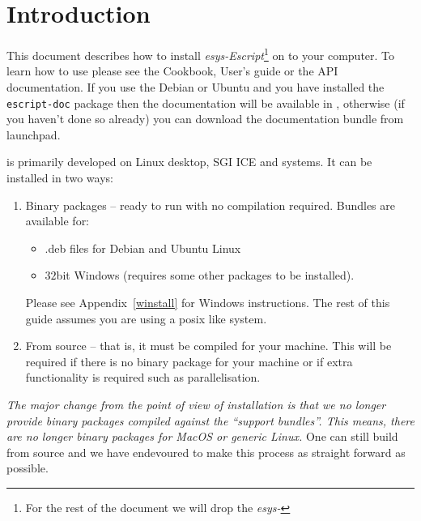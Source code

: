 %
%
%

\chapter{Introduction}
This document describes how to install \emph{esys-Escript}\footnote{For the rest of the document we will drop the \emph{esys-}} on to your computer.
To learn how to use \esfinley please see the Cookbook, User's guide or the API documentation.
If you use the Debian or Ubuntu and you have installed the \texttt{escript-doc} package then the documentation 
will be available in
, otherwise (if you haven't done so already) you can download the documentation bundle 
from launchpad.



\esfinley is primarily developed on Linux desktop, SGI ICE and \macosx systems.
It can be installed in two ways:
\begin{enumerate}
  \item Binary packages -- ready to run with no compilation required.
      Bundles are available for:
      \begin{itemize}
	  \item .deb files for Debian and Ubuntu Linux
	  \item $32$bit Windows (requires some other packages to be installed).
      \end{itemize}
    Please see Appendix~\ref{winstall} for Windows instructions.
    The rest of this guide assumes you are using a posix like system.
  \item From source -- that is, it must be compiled for your machine.
  This will be required if there is no binary package 
    for your machine or if extra functionality is required such as \mpi parallelisation.
\end{enumerate}

\emph{The major change from the point of view of installation is that we no longer provide binary packages compiled
against the ``support bundles''.
This means, there are no longer binary packages for MacOS or generic Linux.
}
One can still build from source and we have endevoured to make this process as straight forward as possible.

